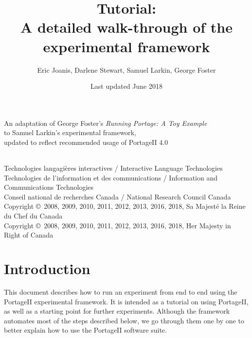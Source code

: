 \documentclass[11pt,letterpaper]{article}
\title{\PS Tutorial: \\
       A detailed walk-through of the \\
       experimental framework}
\date{Last updated June 2018}
\author{Eric Joanis, Darlene Stewart, Samuel Larkin, George Foster}
\newcommand{\PS}{PortageII\xspace}
\begin{document}
\vfill

\maketitle

\vfill

\begin{center}
An adaptation of George Foster's \emph{Running Portage: A Toy Example} \\
to Samuel Larkin's experimental framework,\\
updated to reflect recommended usage of PortageII 4.0
\end{center}

\vfill
\vfill

\begin{center}
{~} \\ \footnotesize
   Technologies langagières interactives /
      Interactive Language Technologies \\
   Technologies de l'information et des communications /
      Information and Communications Technologies \\
   Conseil national de recherches Canada /
      National Research Council Canada \\
   Copyright \copyright\ 2008, 2009, 2010, 2011, 2012, 2013, 2016, 2018, Sa Majesté la Reine du Chef du Canada
   \\ Copyright \copyright\ 2008, 2009, 2010, 2011, 2012, 2013, 2016, 2018, Her Majesty in Right of Canada
\end{center}

\vfill

\newpage


\tableofcontents


\newpage


\section{Introduction}

This document describes how to run an experiment from end to end using the \PS
experimental framework. It is intended as a tutorial on using \PS, as well as a
starting point for further experiments.  Although the framework automates most
of the steps described below, we go through them one by one to
better explain how to use the \PS software suite.
\end{document}
